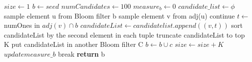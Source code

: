 \documentclass[a4paper]{article}
\begin{document}
\begin{algorithm}
\caption{$Community\_detection (seed)$}

\begin{algorithmic}[1]
\State $ size\gets 1$
\State $ b\gets seed$        
\State $ numCandidates\gets 100$        
\State $ measure_b\gets 0$ 
\State $candidate\_list\gets\phi$
\State sample element u from Bloom filter b
\State sample element v from adj(u)
\State continue
\EndIf
\State $t \gets$ numOnes in $adj(v) \cap b$
\State $candidateList\gets candidatelist.append((v,t))$ 
\State sort candidateList by the second element in each tuple
\State truncate candidateList to top K
\State put candidateList in another Bloom filter C
\State $b\gets b \cup c$
\State $size \gets size + K$
\State $update measure\_b$
\Else \State break
\EndIf
\EndFor
\EndWhile
\State \textbf{return} b
\EndProcedure
\end{algorithmic}
\end{algorithm}
\end{document}
